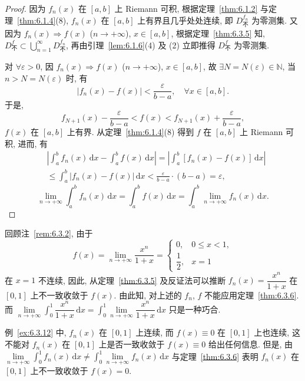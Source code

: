 \begin{proof}
因为 $f_{n}(x)$ 在 $[a,b]$ 上 Riemann 可积, 根据定理~\ref{thm:6.1.2} 与定理~\ref{thm:6.1.4}(8), $f_{n}(x)$ 在 $[a,b]$ 上有界且几乎处处连续, 即 $D_{\text{不}}^{f_{n}}$ 为零测集. 又因为 $f_{n}(x)\Rightarrow f(x)$ ($n\to+\infty$), $x\in[a,b]$, 根据定理~\ref{thm:6.3.5} 知, $D_{\text{不}}^{f}\subset\bigcup\limits_{n=1}^{\infty}D_{\text{不}}^{f_{n}}$, 再由引理~\ref{lem:6.1.6}(4) 及 (2) 立即推得 $D_{\text{不}}^{f}$ 为零测集.

对 $\forall\varepsilon>0$, 因 $f_{n}(x)\Rightarrow f(x)$ ($n\to+\infty$), $x\in[a,b]$, 故 $\exists N=N(\varepsilon)\in\mathbb{N}$, 当 $n>N=N(\varepsilon)$ 时, 有
\[
|f_{n}(x)-f(x)|<\frac{\varepsilon}{b-a},\quad\forall x\in[a,b].
\]
于是,
\[
f_{N+1}(x)-\frac{\varepsilon}{b-a}<f(x)<f_{N+1}(x)+\frac{\varepsilon}{b-a},
\]
$f(x)$ 在 $[a,b]$ 上有界. 从定理~\ref{thm:6.1.4}(8) 得到 $f$ 在 $[a,b]$ 上 Riemann 可积, 进而, 有
\[
\begin{aligned}
&\left|\int_{a}^{b}f_{n}(x)\,\mathrm{d}x-\int_{a}^{b}f(x)\,\mathrm{d}x\right|=\left|\int_{a}^{b}[f_{n}(x)-f(x)]\,\mathrm{d}x\right|\\
&\leqslant\int_{a}^{b}|f_{n}(x)-f(x)|\,\mathrm{d}x<\frac{\varepsilon}{b-a}\cdot(b-a)=\varepsilon,
\end{aligned}
\]
\[
\lim_{n\to+\infty}\int_{a}^{b}f_{n}(x)\,\mathrm{d}x=\int_{a}^{b}f(x)\,\mathrm{d}x=\int_{a}^{b}\lim_{n\to+\infty}f_{n}(x)\,\mathrm{d}x.
\]
\end{proof}

回顾注~\ref{rem:6.3.2}, 由于
\[
f(x)=\lim_{n\to+\infty}\frac{x^{n}}{1+x}=\begin{cases}0,&0\leqslant x<1,\\\dfrac{1}{2},&x=1\end{cases}
\]
在 $x=1$ 不连续, 因此, 从定理~\ref{thm:6.3.5} 及反证法可以推断 $f_{n}(x)=\dfrac{x^{n}}{1+x}$ 在 $[0,1]$ 上不一致收敛于 $f(x)$. 由此知, 对上述的 $f_{n}$, $f$ 不能应用定理~\ref{thm:6.3.6}. 而 $\lim\limits_{n\to+\infty}\int_{0}^{1}\dfrac{x^{n}}{1+x}\,\mathrm{d}x=\int_{0}^{1}\lim\limits_{n\to+\infty}\dfrac{x^{n}}{1+x}\,\mathrm{d}x$ 只是一种巧合.

例~\ref{ex:6.3.12} 中, $f_{n}(x)$ 在 $[0,1]$ 上连续, 而 $f(x)\equiv 0$ 在 $[0,1]$ 上也连续, 这不能对 $f_{n}(x)$ 在 $[0,1]$ 上是否一致收敛于 $f(x)\equiv 0$ 给出任何信息. 但是, 由\linebreak[4]$\lim\limits_{n\to+\infty}\int_{0}^{1}f_{n}(x)\,\mathrm{d}x\neq\int_{0}^{1}\lim\limits_{n\to+\infty}f_{n}(x)\,\mathrm{d}x$ 与定理~\ref{thm:6.3.6} 表明 $f_{n}(x)$ 在 $[0,1]$ 上不一致收敛于 $f(x)=0$.

